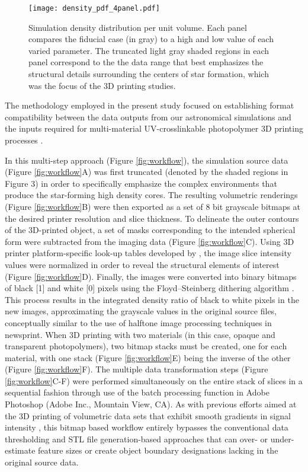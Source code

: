 \documentclass[twocolumn]{aastex63}
\begin{document}
\begin{figure*}[ht!]
    \centering
    \texttt{[image: density\_pdf\_4panel.pdf]}
    \caption{Simulation density distribution per unit volume. Each panel compares the fiducial case (in gray) to a high and low value of each varied parameter. The truncated light gray shaded regions in each panel correspond to the the data range that best emphasizes the structural details surrounding the centers of star formation, which was the focus of the 3D printing studies. 
    }
    \label{fig:pdfs}
\end{figure*}

The methodology employed in the present study focused on establishing format compatibility between the data outputs from our astronomical simulations and the inputs required for multi-material UV-crosslinkable photopolymer 3D printing processes \citep{bader_2016, bader_2018, hosny_2018}.

In this multi-step approach (Figure \ref{fig:workflow}), the simulation source data (Figure \ref{fig:workflow}A) was first truncated (denoted by the shaded regions in Figure 3) in order to specifically emphasize the complex environments that produce the star-forming high density cores.  The resulting volumetric renderings (Figure \ref{fig:workflow}B) were then exported as a set of 8 bit grayscale bitmaps at the desired printer resolution and slice thickness. To delineate the outer contours of the 3D-printed object, a set of masks corresponding to the intended spherical form were subtracted from the imaging data (Figure \ref{fig:workflow}C). Using 3D printer platform-specific look-up tables developed by \cite{bader_2018}, the image slice intensity values were normalized in order to reveal the structural elements of interest (Figure \ref{fig:workflow}D). Finally, the images were converted into binary bitmaps of black [1] and white [0] pixels using the Floyd–Steinberg dithering algorithm \citep{Floyd_1976}. This process results in the integrated density ratio of black to white pixels in the new images, approximating the grayscale values in the original source files, conceptually similar to the use of halftone image processing techniques in newsprint. When 3D printing with two materials (in this case, opaque and transparent photopolymers), two bitmap stacks must be created, one for each material, with one stack (Figure \ref{fig:workflow}E) being the inverse of the other (Figure \ref{fig:workflow}F). The multiple data transformation steps (Figure \ref{fig:workflow}C-F) were performed simultaneously on the entire stack of slices in a sequential fashion through use of the batch processing function in Adobe Photoshop (Adobe Inc., Mountain View, CA). As with previous efforts aimed at the 3D printing of volumetric data sets that exhibit smooth gradients in signal intensity \citep{hosny_2018}, this bitmap based workflow entirely bypasses the conventional data thresholding and STL file generation-based approaches that can over- or under-estimate feature sizes or create object boundary designations lacking in the original source data. 
\end{document}
